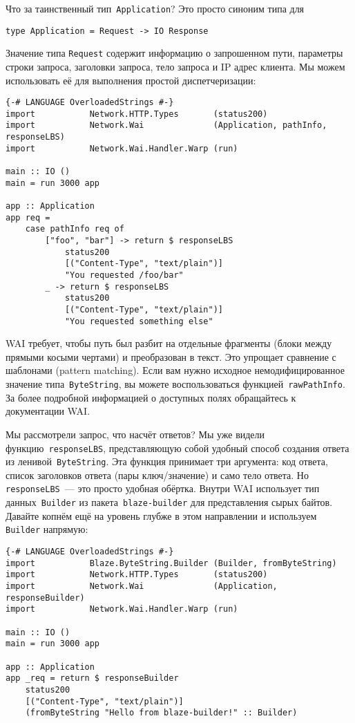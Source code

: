 Что за таинственный тип~\lstinline'Application'? Это просто синоним типа для
\begin{lstlisting}
type Application = Request -> IO Response
\end{lstlisting}
Значение типа \lstinline'Request' содержит информацию о запрошенном пути,
параметры строки запроса, заголовки запроса, тело запроса и IP адрес клиента.
Мы можем использовать её для выполнения простой диспетчеризации:
\begin{lstlisting}
{-# LANGUAGE OverloadedStrings #-}
import           Network.HTTP.Types       (status200)
import           Network.Wai              (Application, pathInfo, responseLBS)
import           Network.Wai.Handler.Warp (run)

main :: IO ()
main = run 3000 app

app :: Application
app req =
    case pathInfo req of
        ["foo", "bar"] -> return $ responseLBS
            status200
            [("Content-Type", "text/plain")]
            "You requested /foo/bar"
        _ -> return $ responseLBS
            status200
            [("Content-Type", "text/plain")]
            "You requested something else"
\end{lstlisting}

WAI требует, чтобы путь был разбит на отдельные фрагменты (блоки между прямыми
косыми чертами) и преобразован в текст. Это упрощает сравнение с шаблонами
(pattern matching). Если вам нужно исходное немодифицированное значение
типа~\lstinline'ByteString', вы можете воспользоваться
функцией~\lstinline'rawPathInfo'. За более подробной информацией о доступных
полях обращайтесь к документации WAI.

Мы рассмотрели запрос, что насчёт ответов? Мы уже видели
функцию~\lstinline'responseLBS', представляющую собой удобный способ создания
ответа из ленивой~\lstinline'ByteString'. Эта функция принимает три аргумента:
код ответа, список заголовков ответа (пары ключ/значение) и само тело ответа.
Но \lstinline'responseLBS'~--- это просто удобная обёртка. Внутри WAI
использует тип данных~\lstinline'Builder' из пакета~\texttt{blaze-builder} для
представления сырых байтов. Давайте копнём ещё на уровень глубже в этом
направлении и используем \lstinline'Builder' напрямую:
\begin{lstlisting}
{-# LANGUAGE OverloadedStrings #-}
import           Blaze.ByteString.Builder (Builder, fromByteString)
import           Network.HTTP.Types       (status200)
import           Network.Wai              (Application, responseBuilder)
import           Network.Wai.Handler.Warp (run)

main :: IO ()
main = run 3000 app

app :: Application
app _req = return $ responseBuilder
    status200
    [("Content-Type", "text/plain")]
    (fromByteString "Hello from blaze-builder!" :: Builder)
\end{lstlisting}

